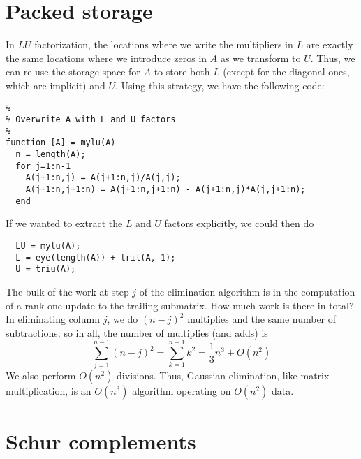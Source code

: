\documentclass[12pt, leqno]{article} %
\begin{document}

\section{Packed storage}

In $LU$ factorization, the locations where we write the multipliers in
$L$ are exactly the same locations where we introduce zeros in $A$ as we
transform to $U$.  Thus, we can re-use the storage space for $A$ to
store both $L$ (except for the diagonal ones, which are implicit) and
$U$.  Using this strategy, we have the following code:
\begin{lstlisting}
%
% Overwrite A with L and U factors
%
function [A] = mylu(A)
  n = length(A);
  for j=1:n-1
    A(j+1:n,j) = A(j+1:n,j)/A(j,j);
    A(j+1:n,j+1:n) = A(j+1:n,j+1:n) - A(j+1:n,j)*A(j,j+1:n);
  end
\end{lstlisting}
If we wanted to extract the $L$ and $U$ factors explicitly, we could
then do
\begin{lstlisting}
  LU = mylu(A);
  L = eye(length(A)) + tril(A,-1);
  U = triu(A);
\end{lstlisting}

The bulk of the work at step $j$ of the elimination algorithm is in
the computation of a rank-one update to the trailing submatrix.
How much work is there in total?  In eliminating column $j$, we do
$(n-j)^2$ multiplies and the same number of subtractions; so in all,
the number of multiplies (and adds) is
\[
  \sum_{j=1}^{n-1} (n-j)^2 = \sum_{k=1}^{n-1} k^2 = \frac{1}{3} n^3 + O(n^2)
\]
We also perform $O(n^2)$ divisions.  Thus, Gaussian elimination, like
matrix multiplication, is an $O(n^3)$ algorithm operating on $O(n^2)$ data.

\section{Schur complements}
\end{document}
